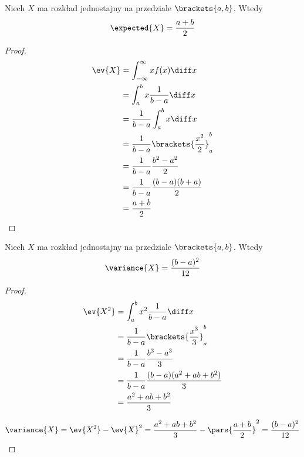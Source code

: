 \begin{theorem}
	Niech \( X \) ma rozkład jednostajny na przedziale \( \brackets{a, b} \). Wtedy
	\[
		\expected{X} = \frac{a + b}{2}
	\]
\end{theorem}
\begin{proof}
	\begin{align*}
		\ev{X} & = \int_{-\infty}^\infty x f(x) \diff x       \\
		       & = \int_a^b x \frac{1}{b-a} \diff x           \\
		       & = \frac{1}{b-a} \int_a^b x \diff x           \\
		       & = \frac{1}{b-a} \brackets{\frac{x^2}{2}}_a^b \\
		       & = \frac{1}{b-a} \frac{b^2 - a^2}{2}          \\
		       & = \frac{1}{b-a} \frac{(b-a)(b+a)}{2}         \\
		       & = \frac{a+b}{2}
	\end{align*}
\end{proof}

\begin{theorem}
	Niech \( X \) ma rozkład jednostajny na przedziale \( \brackets{a, b} \). Wtedy
	\[
		\variance{X} = \frac{(b-a)^2}{12}
	\]
\end{theorem}
\begin{proof}
	\begin{align*}
		\ev{X^2} & = \int_a^b x^2 \frac{1}{b-a} \diff x         \\
		         & = \frac{1}{b-a} \brackets{\frac{x^3}{3}}_a^b \\
		         & = \frac{1}{b-a} \frac{b^3 - a^3}{3}          \\
		         & = \frac{1}{b-a} \frac{(b-a)(a^2+ab+b^2)}{3}  \\
		         & = \frac{a^2+ab+b^2}{3}
	\end{align*}

	\[
		\variance{X} = \ev{X^2} - \ev{X}^2 = \frac{a^2+ab+b^2}{3} - \pars{\frac{a+b}{2}}^2 = \frac{(b-a)^2}{12}
	\]
\end{proof}

